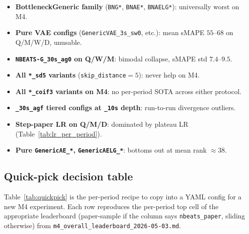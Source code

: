 \documentclass[11pt,a4paper]{article}
\begin{document}
\begin{itemize}\itemsep -1pt
\item \textbf{BottleneckGeneric family} (\texttt{BNG*}, \texttt{BNAE*}, \texttt{BNAELG*}): universally worst on M4.
\item \textbf{Pure VAE configs} (\texttt{GenericVAE\_3s\_sw0}, etc.): mean sMAPE $55$--$68$ on Q/M/W/D, unusable.
\item \textbf{\texttt{NBEATS-G\_30s\_ag0} on Q/W/M}: bimodal collapse, sMAPE std $7.4$--$9.5$.
\item \textbf{All \texttt{*\_sd5} variants} (\texttt{skip\_distance}$=5$): never help on M4.
\item \textbf{All \texttt{*\_coif3} variants on M4}: no per-period SOTA across either protocol.
\item \textbf{\texttt{\_30s\_agf} tiered configs at \texttt{\_10s} depth}: run-to-run divergence outliers.
\item \textbf{Step-paper LR on Q/M/D}: dominated by plateau LR (Table~\ref{tab:lr_per_period}).
\item \textbf{Pure \texttt{GenericAE\_*}, \texttt{GenericAELG\_*}}: bottoms out at mean rank $\approx 38$.
\end{itemize}

\subsection{Quick-pick decision table}
\label{app:hyperparams:quickpick}

Table~\ref{tab:quickpick} is the per-period recipe to copy into a YAML config for a new M4 experiment. Each row reproduces the per-period top cell of the appropriate leaderboard (paper-sample if the column says \texttt{nbeats\_paper}, sliding otherwise) from \texttt{m4\_overall\_leaderboard\_2026-05-03.md}.
\end{document}
